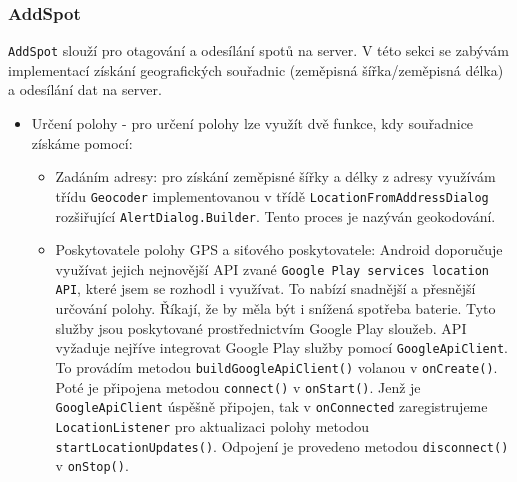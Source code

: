 \documentclass[12pt]{article}
\begin{document}
\subsubsection{AddSpot}
\label{knihovny}
\verb+AddSpot+ slouží pro otagování a odesílání spotů na server. V této sekci se zabývám implementací získání geografických souřadnic (zeměpisná šířka/zeměpisná délka) a odesílání dat na server.
\begin{itemize}
\item Určení polohy - pro určení polohy lze využít dvě funkce, kdy souřadnice získáme pomocí:
\begin{itemize}
\item Zadáním adresy: pro získání zeměpisné šířky a délky z adresy využívám třídu \verb+Geocoder+ implementovanou v třídě \verb+LocationFromAddressDialog+ rozšiřující \verb+AlertDialog.Builder+. Tento proces je nazýván geokodování.\cite{geocoder}
\item Poskytovatele polohy GPS a siťového poskytovatele: Android doporučuje využívat jejich nejnovější API zvané \verb+Google Play services location API+, které jsem se rozhodl i využívat. To nabízí snadnější a přesnější určování polohy. Říkají, že by měla být i snížená spotřeba baterie. Tyto služby jsou poskytované prostřednictvím Google Play sloužeb. API vyžaduje nejříve integrovat Google Play služby pomocí \verb+GoogleApiClient+. To provádím metodou \verb+buildGoogleApiClient()+ volanou v \verb+onCreate()+. Poté je připojena metodou \verb+connect()+ v \verb+onStart()+. Jenž je \verb+GoogleApiClient+ úspěšně připojen, tak v \verb+onConnected+ zaregistrujeme \verb+LocationListener+ pro aktualizaci polohy metodou \verb+startLocationUpdates()+. Odpojení je provedeno metodou \verb+disconnect()+ v \verb+onStop()+.\cite{location}
\end{itemize}

\end{itemize}
\end{document}
